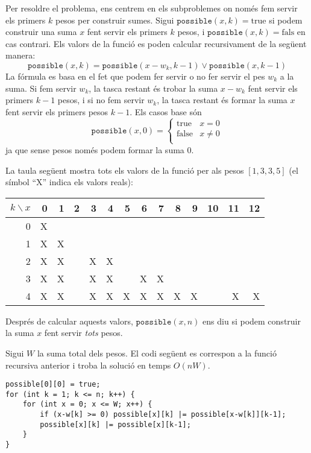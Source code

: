 Per resoldre el problema, ens centrem en els subproblemes
on només fem servir els primers $k$ pesos
per construir sumes.
Sigui $\texttt{possible}(x,k)=\textrm{true}$ si
podem construir una suma $x$
fent servir els primers $k$ pesos,
i $\texttt{possible}(x,k)=\textrm{fals}$ en cas contrari.
Els valors de la funció es poden calcular recursivament
de la següent manera:
\[ \texttt{possible}(x,k) = \texttt{possible}(x-w_k,k-1) \lor \texttt{possible}(x,k-1) \]
La fórmula es basa en el fet que podem
fer servir o no fer servir el pes $w_k$ a la suma.
Si fem servir $w_k$, la tasca restant és
trobar la suma $x-w_k$ fent servir els primers $k-1$ pesos,
i si no fem servir $w_k$,
la tasca restant és formar la suma $x$
fent servir els primers pesos $k-1$.
Els casos base són
\begin{equation*}
    \texttt{possible}(x,0) = \begin{cases}
               \textrm{true}    & x = 0\\
               \textrm{false}   & x \neq 0 \\
           \end{cases}
\end{equation*}
ja que sense pesos només podem formar la suma 0.

La taula següent mostra tots els valors de la funció
per als pesos $[1,3,3,5]$ (el símbol ``X''
indica els valors reals):

\begin{center}
\begin{tabular}{r|rrrrrrrrrrrrr}
$k \backslash x$ & 0 & 1 & 2 & 3 & 4 & 5 & 6 & 7 & 8 & 9 & 10 & 11 & 12 \\
\hline
 0 & X & \\
 1 & X & X \\
 2 & X & X & & X & X \\
 3 & X & X & & X & X & & X & X \\
 4 & X & X & & X & X & X & X & X & X & X & & X & X \\
\end{tabular}
\end{center}

Després de calcular aquests valors, $\texttt{possible}(x,n)$
ens diu si podem construir la
suma $x$ fent servir \emph{tots} pesos.

Sigui $W$ la suma total dels pesos.
El codi següent es correspon a la funció recursiva anterior i troba la
solució en temps $O(nW)$.
\begin{lstlisting}
possible[0][0] = true;
for (int k = 1; k <= n; k++) {
    for (int x = 0; x <= W; x++) {
        if (x-w[k] >= 0) possible[x][k] |= possible[x-w[k]][k-1];
        possible[x][k] |= possible[x][k-1];
    }
}
\end{lstlisting}


